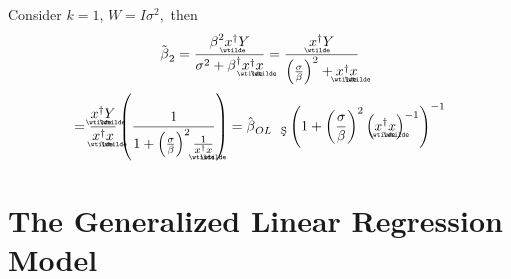 \documentclass{article}
\begin{document}
Consider $k=1$, $W=I\sigma ^{2},$ then%
\begin{equation*}
\tilde{\beta}_{2}=\frac{\beta ^{2}%
\underaccent{\wtilde}{x}%
^{\dagger }Y}{\sigma ^{2}+\beta ^{\dagger }%
\underaccent{\wtilde}{x}%
^{\dagger }%
\underaccent{\wtilde}{x}%
}=\frac{%
\underaccent{\wtilde}{x}%
^{\dagger }Y}{\left( \frac{\sigma }{\beta }\right) ^{2}+%
\underaccent{\wtilde}{x}%
^{\dagger }%
\underaccent{\wtilde}{x}%
}
\end{equation*}%
\begin{equation*}
=\frac{%
\underaccent{\wtilde}{x}%
^{\dagger }%
\underaccent{\wtilde}{Y}%
}{%
\underaccent{\wtilde}{x}%
^{\dagger }%
\underaccent{\wtilde}{x}%
}\left( \frac{1}{1+\left( \frac{\sigma }{\beta }\right) ^{2}\frac{1}{%
\underaccent{\wtilde}{x}%
^{\dagger }%
\underaccent{\wtilde}{x}%
}}\right) =\hat{\beta}_{OL\text{\c{S}}}\left( 1+\left( \frac{\sigma }{\beta }%
\right) ^{2}\left( 
\underaccent{\wtilde}{x}%
^{\dagger }%
\underaccent{\wtilde}{x}%
\right) ^{-1}\right) ^{-1}
\end{equation*}

\bigskip

\newpage

\part{The Generalized Linear Regression Model}
\end{document}
